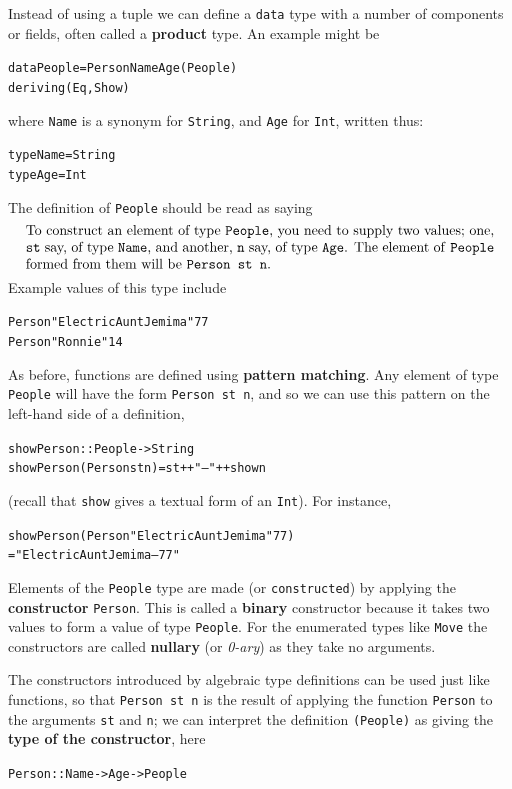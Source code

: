 Instead of using a tuple we can define a \texttt{data} type with a number of
components or fields, often called a \textbf{product} type. An
example might be
\begin{alltt}
data People = Person Name Age \hfill (People)
              deriving (Eq,Show)
\end{alltt}
where \texttt{Name} is a synonym for \texttt{String}, and \texttt{Age} for \texttt{Int},
written thus:
\begin{alltt}
type Name = String
type Age  = Int
\end{alltt}
The definition of \texttt{People} should be read as saying
\[
\parbox{28pc}{To construct an element of type \texttt{People}, you need to supply two values;
one,
\texttt{st} say, of
type \texttt{Name}, and another, \texttt{n} say, of type \texttt{Age}. The
element of \texttt{People} formed from them will be \texttt{Person st n}.} 
\]
Example values of this type include
\begin{alltt}
Person "Electric Aunt Jemima" 77
Person "Ronnie" 14
\end{alltt}
As before,  
functions are defined using \textbf{pattern matching}. Any element of type 
\texttt{People} will have the form \texttt{Person st n}, and so we can use this pattern on the
left-hand side of a definition,
\begin{alltt}
showPerson :: People -> String
showPerson (Person st n) = st ++ " -- " ++ show n
\end{alltt}
(recall that \texttt{show} gives a textual form of an \texttt{Int}). For instance,
\begin{alltt}
showPerson (Person "Electric Aunt Jemima" 77)
 = "Electric Aunt Jemima -- 77"
\end{alltt}
Elements of the \texttt{People} type are made (or \texttt{constructed}) by applying the \textbf{constructor} \texttt{Person}. This is called a 
\textbf{binary} constructor
because it takes two values to form a value of type 
\texttt{People}. For the enumerated types like \texttt{Move} the constructors
are called \textbf{nullary}
(or {\em 0-ary}) as they take no arguments. 
 
The constructors introduced by algebraic type definitions can be used
just like functions, so that \texttt{Person st n} is the result of applying
the function \texttt{Person} to the arguments \texttt{st} and \texttt{n}; we can
interpret the definition \texttt{(People)} as giving the \textbf{type of the constructor}, here
\begin{alltt}
Person :: Name -> Age -> People
\end{alltt}

